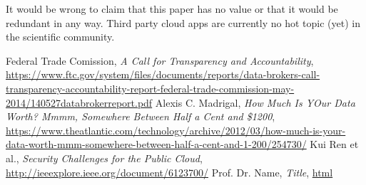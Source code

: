 \documentclass[11pt,twocolumn,a4paper,DIV=calc]{scrartcl}
\begin{document}
It would be wrong to claim that this paper has no value or that it would be redundant in any way.
Third party cloud apps are currently no hot topic (yet) in the scientific community.
 

\begin{thebibliography}{99}
  Federal Trade Comission, \emph{A Call for Transparency and Accountability}, \url{https://www.ftc.gov/system/files/documents/reports/data-brokers-call-transparency-accountability-report-federal-trade-commission-may-2014/140527databrokerreport.pdf}
  Alexis C. Madrigal, \emph{How Much Is YOur Data Worth? Mmmm, Somewhere Between Half a Cent and \$1200}, \url{https://www.theatlantic.com/technology/archive/2012/03/how-much-is-your-data-worth-mmm-somewhere-between-half-a-cent-and-1-200/254730/}
  Kui Ren et al., \emph{Security Challenges for the Public Cloud}, \url{http://ieeexplore.ieee.org/document/6123700/}
  Prof. Dr. Name, \emph{Title}, \url{html}
\end{thebibliography}
\end{document}
